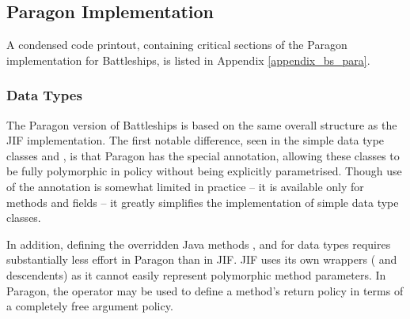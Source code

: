 %

\newpage

\subsection{Paragon Implementation}

A condensed code printout, containing critical sections of the Paragon implementation for Battleships, is listed in Appendix \ref{appendix_bs_para}.

\subsubsection{Data Types}

The Paragon version of Battleships is based on the same overall structure as the JIF implementation. The first notable difference, seen in the simple data type classes  and , is that Paragon has the special  annotation, allowing these classes to be fully polymorphic in policy without being explicitly parametrised. Though use of the  annotation is somewhat limited in practice -- it is available only for methods and  fields -- it greatly simplifies the implementation of simple data type classes.

In addition, defining the overridden Java methods ,  and  for data types requires substantially less effort in Paragon than in JIF. JIF uses its own wrappers ( and descendents) as it cannot easily represent polymorphic method parameters. In Paragon, the  operator may be used to define a method's return policy in terms of a completely free argument policy.

